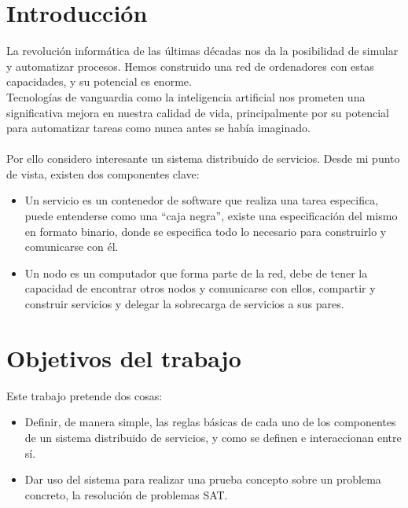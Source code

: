 \documentclass[11pt]{article}
\begin{document}
	\section{Introducción}
		La revolución informática de las últimas décadas nos da la posibilidad de simular y automatizar procesos. 
		Hemos construido una red de ordenadores con estas capacidades, y su potencial es enorme.\\
		Tecnologías de vanguardia como la inteligencia artificial nos prometen
		una significativa mejora en nuestra calidad de vida, principalmente por su potencial para automatizar tareas como nunca antes se había imaginado. \\
		\\
		Por ello considero interesante un sistema distribuido de servicios. Desde mi punto de vista, existen dos componentes clave:
		\begin{itemize}
			\item Un servicio es un contenedor de software que realiza una tarea especifica, puede entenderse como una ``caja negra'', existe una especificación del mismo en 
				formato binario, donde se especifica todo lo necesario para construirlo y comunicarse con él.
			\item Un nodo es un computador que forma parte de la red, debe de tener la capacidad de encontrar otros nodos y comunicarse con ellos, compartir y construir servicios
				y delegar la sobrecarga de servicios a sus pares.
		\end{itemize}

	\section{Objetivos del trabajo}
		Este trabajo pretende dos cosas:
		\begin{itemize}
			\item Definir, de manera simple, 
				las reglas básicas de cada uno de los componentes de un sistema distribuido de servicios,
				y como se definen e interaccionan entre sí.
			\item Dar uso del sistema para realizar una prueba concepto sobre un problema concreto, la resolución de problemas SAT.
		\end{itemize}
\end{document}
